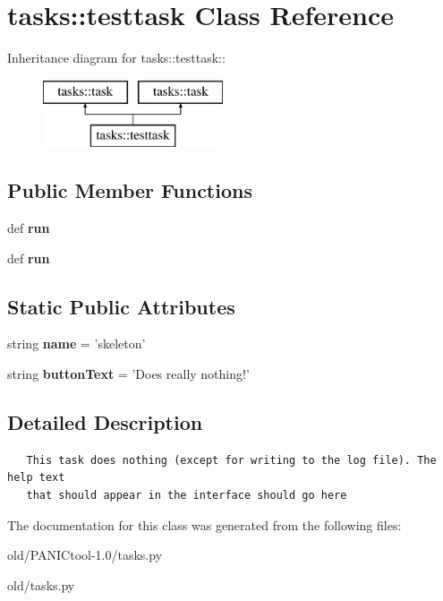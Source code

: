 \section{tasks::testtask Class Reference}
\label{classtasks_1_1testtask}
Inheritance diagram for tasks::testtask::\begin{figure}[H]
\begin{center}
\leavevmode
\includegraphics[height=2cm]{classtasks_1_1testtask}
\end{center}
\end{figure}
\subsection*{Public Member Functions}
\begin{CompactItemize}
\item 
def \textbf{run}\label{classtasks_1_1testtask_00fe50b803e43fde0d25bfc73aa436c1}

\item 
def \textbf{run}\label{classtasks_1_1testtask_00fe50b803e43fde0d25bfc73aa436c1}

\end{CompactItemize}
\subsection*{Static Public Attributes}
\begin{CompactItemize}
\item 
string \textbf{name} = 'skeleton'\label{classtasks_1_1testtask_8f077e1e4f67469fa5cf6e0c22a02997}

\item 
string \textbf{button\-Text} = 'Does really nothing!'\label{classtasks_1_1testtask_53905d7258165161f7a752124a7e4aba}

\end{CompactItemize}


\subsection{Detailed Description}


\footnotesize\begin{verbatim}
   This task does nothing (except for writing to the log file). The help text
   that should appear in the interface should go here
\end{verbatim}
\normalsize
 



The documentation for this class was generated from the following files:\begin{CompactItemize}
\item 
old/PANICtool-1.0/tasks.py\item 
old/tasks.py\end{CompactItemize}
